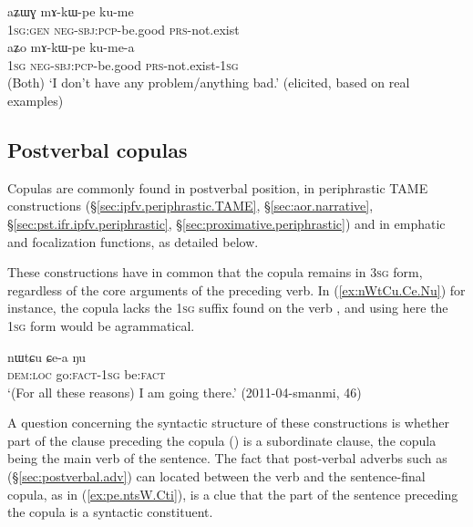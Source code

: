 \begin{exe}
\ex 
\begin{xlist}
\ex \label{ex:mAkWpe.kume}
\gll aʑɯɣ mɤ-kɯ-pe ku-me \\
\textsc{1sg}:\textsc{gen} \textsc{neg}-\textsc{sbj}:\textsc{pcp}-be.good \textsc{prs}-not.exist \\
\ex \label{ex:mAkWpe.kumea}
\gll aʑo mɤ-kɯ-pe ku-me-a \\
 \textsc{1sg}  \textsc{neg}-\textsc{sbj}:\textsc{pcp}-be.good \textsc{prs}-not.exist-\textsc{1sg} \\
 \glt (Both) `I don't have any problem/anything bad.' (elicited, based on real examples) 
 \end{xlist} 
\end{exe}


\subsection{Postverbal copulas}  \label{sec:postverbal.copulas}
Copulas are commonly found in postverbal position, in periphrastic TAME constructions (§\ref{sec:ipfv.periphrastic.TAME}, §\ref{sec:aor.narrative}, §\ref{sec:pst.ifr.ipfv.periphrastic}, §\ref{sec:proximative.periphrastic}) and in emphatic and focalization functions, as detailed below.

These constructions have in common that the copula remains in \textsc{3sg} form, regardless of the core arguments of the preceding verb. In (\ref{ex:nWtCu.Ce.Nu}) for instance, the copula  lacks the \textsc{1sg} suffix found on the verb , and using here the \textsc{1sg} form  would be agrammatical.


\begin{exe}
\ex \label{ex:nWtCu.Ce.Nu}
\gll nɯtɕu ɕe-a ŋu \\
\textsc{dem}:\textsc{loc} go:\textsc{fact}-\textsc{1sg} be:\textsc{fact} \\
\glt `(For all these reasons) I am going there.' (2011-04-smanmi, 46)
\end{exe}

A question concerning the syntactic structure of these constructions is whether part of the clause preceding the copula () is a subordinate clause, the copula being the main verb of the sentence. The fact that post-verbal adverbs such as  (§\ref{sec:postverbal.adv}) can located between the verb and the sentence-final copula, as in (\ref{ex:pe.ntsW.Cti}), is a clue that the part of the sentence preceding the copula is a syntactic constituent.

